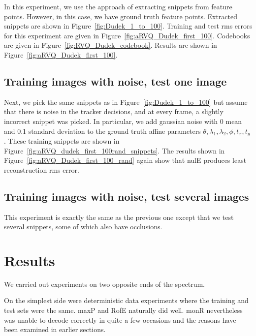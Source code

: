 In this experiment, we use the approach of extracting snippets from feature points.  However, in this case, we have ground truth feature points.  Extracted snippets are shown in Figure~\ref{fig:Dudek_1_to_100}.  Training and test rms errors for this experiment are given in Figure~\ref{fig:aRVQ_Dudek_first_100}.  Codebooks are given in Figure~\ref{fig:RVQ_Dudek_codebook}.  Results are shown in Figure~\ref{fig:aRVQ_Dudek_first_100}.




\subsection{Training images with noise, test one image}
Next, we pick the same snippets as in Figure~\ref{fig:Dudek_1_to_100} but assume that there is noise in the tracker decisions, and at every frame, a slightly incorrect snippet was picked.  In particular, we add gaussian noise with 0 mean and 0.1 standard deviation to the ground truth affine parameters $\theta, \lambda_1, \lambda_2, \phi, t_x, t_y$.  These training snippets are shown in Figure~\ref{fig:aRVQ_dudek_first_100rand_snippets}.  The results shown in Figure~\ref{fig:aRVQ_Dudek_first_100_rand} again show that nulE produces least reconstruction rms error.

\subsection{Training images with noise, test several images}
This experiment is exactly the same as the previous one except that we test several snippets, some of which also have occlusions.

\section{Results}







We carried out experiments on two opposite ends of the spectrum. 

On the simplest side were deterministic data experiments where the training and test sets were the same.  maxP and RofE naturally did well.  monR nevertheless was unable to decode correctly in quite a few occasions and the reasons have been examined in earlier sections.  

